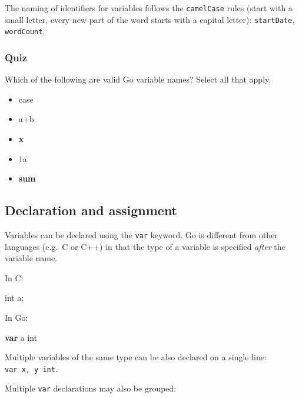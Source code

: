 \documentclass[]{book}
\newenvironment{Shaded}{\begin{snugshade}}{\end{snugshade}}
\newcommand{\DataTypeTok}[1]{\textcolor[rgb]{0.13,0.29,0.53}{#1}}
\newcommand{\KeywordTok}[1]{\textcolor[rgb]{0.13,0.29,0.53}{\textbf{#1}}}
\newcommand{\NormalTok}[1]{#1}
\providecommand{\tightlist}{%
  \setlength{\itemsep}{0pt}\setlength{\parskip}{0pt}}
\let\BeginKnitrBlock\begin \let\EndKnitrBlock\end
\begin{document}
The naming of identifiers for variables follows the \texttt{camelCase} rules (start
with a small letter, every new part of the word starts with a capital letter):
\texttt{startDate}, \texttt{wordCount}.

\hypertarget{quiz-9}{%
\subsubsection*{Quiz}\label{quiz-9}}

Which of the following are valid Go variable names? Select all that apply.

\begin{itemize}
\tightlist
\item
  case
\item
  a+b
\item
  \textbf{x}
\item
  1a
\item
  \textbf{sum}
\end{itemize}

\hypertarget{declaration-and-assignment}{%
\subsection{Declaration and assignment}\label{declaration-and-assignment}}

Variables can be declared using the \texttt{var} keyword. Go is different from other
languages (e.g.~C or C++) in that the type of a variable is specified \emph{after}
the variable name.

In C:

\begin{Shaded}
\begin{Highlighting}[]
\DataTypeTok{int}\NormalTok{ a;}
\end{Highlighting}
\end{Shaded}

In Go:

\begin{Shaded}
\begin{Highlighting}[]
\KeywordTok{var}\NormalTok{ a }\DataTypeTok{int}
\end{Highlighting}
\end{Shaded}

\BeginKnitrBlock{rmdnote}
Multiple variables of the same type can be also declared on a single line:
\texttt{var\ x,\ y\ int}.
\EndKnitrBlock{rmdnote}

Multiple \texttt{var} declarations may also be grouped:
\end{document}
